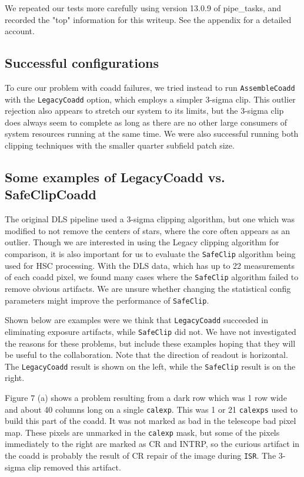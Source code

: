 \documentclass[modern]{aastex61}
\begin{document}
We repeated our tests more carefully using version 13.0.9 of pipe\_tasks, and recorded the "top" information for this writeup. See the appendix for a detailed account.

\bigskip
\subsection{Successful configurations}
To cure our problem with coadd failures, we tried instead to run {\tt\string AssembleCoadd} with the {\tt\string LegacyCoadd} option, which employs a simpler 3-sigma clip. This outlier rejection also appears to stretch our system to its limits, but the 3-sigma clip does always seem to complete as long as there are no other large consumers of system resources running at the same time.
We were also successful running both clipping techniques with the smaller quarter subfield patch size.  
\subsection{Some examples of LegacyCoadd vs. SafeClipCoadd}
The original DLS pipeline used a 3-sigma clipping algorithm, but one which was modified to not remove the centers of stars, where the core often appears as an outlier. Though we are interested in using the Legacy clipping algorithm for comparison, it is also important for us to evaluate the {\tt\string SafeClip} algorithm being used for HSC processing.
With the DLS data, which has up to 22 measurements of each coadd pixel, we found many cases where the {\tt\string SafeClip} algorithm failed to remove obvious artifacts. We are unsure whether changing the statistical config parameters might improve the performance of {\tt\string SafeClip}.

Shown below are examples were we think that {\tt\string LegacyCoadd} succeeded in eliminating exposure artifacts, while {\tt\string SafeClip} did not. We have not investigated the reasons for these problems, but include these examples hoping that they will be useful to the collaboration.  Note that the direction of readout is horizontal.  The {\tt\string LegacyCoadd} result is shown on the left, while the {\tt\string SafeClip} result is on the right.

Figure 7 (a) shows a problem resulting from a dark row which was 1 row wide and about 40 columns long on a single {\tt\string calexp}.  This was 1 or 21 {\tt\string calexps} used to build this part of the coadd. It was not marked as bad in the telescope bad pixel map. These pixels are unmarked in the {\tt\string calexp} mask, but some of the pixels immediately to the right are marked as CR and INTRP, so the curious artifact in the coadd is probably the result of CR repair of the image during {\tt\string ISR}.  The 3-sigma clip removed this artifact.
\end{document}
